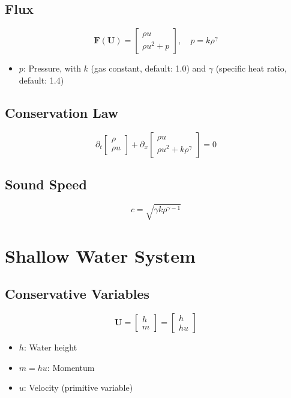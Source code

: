 \documentclass[12pt]{article}
\begin{document}
\subsection{Flux}
\[
\mathbf{F}(\mathbf{U}) = \begin{bmatrix} \rho u \\ \rho u^2 + p \end{bmatrix}, \quad p = k \rho^\gamma
\]
\begin{itemize}
    \item $p$: Pressure, with $k$ (gas constant, default: 1.0) and $\gamma$ (specific heat ratio, default: 1.4)
\end{itemize}

\subsection{Conservation Law}
\[
\partial_t \begin{bmatrix} \rho \\ \rho u \end{bmatrix} + \partial_x \begin{bmatrix} \rho u \\ \rho u^2 + k \rho^\gamma \end{bmatrix} = 0
\]

\subsection{Sound Speed}
\[
c = \sqrt{\gamma k \rho^{\gamma - 1}}
\]

\section{Shallow Water System}
\subsection{Conservative Variables}
\[
\mathbf{U} = \begin{bmatrix} h \\ m \end{bmatrix} = \begin{bmatrix} h \\ h u \end{bmatrix}
\]
\begin{itemize}
    \item $h$: Water height
    \item $m = h u$: Momentum
    \item $u$: Velocity (primitive variable)
\end{itemize}
\end{document}
